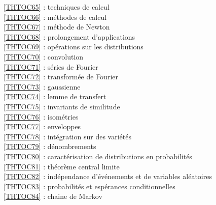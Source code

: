 \ref {THTOC65} : techniques de calcul\\
\ref {THTOC66} : méthodes de calcul\\
\ref {THTOC67} : méthode de Newton\\
\ref {THTOC68} : prolongement d'applications\\
\ref {THTOC69} : opérations sur les distributions\\
\ref {THTOC70} : convolution\\
\ref {THTOC71} : séries de Fourier\\
\ref {THTOC72} : transformée de Fourier\\
\ref {THTOC73} : gaussienne\\
\ref {THTOC74} : lemme de transfert\\
\ref {THTOC75} : invariants de similitude\\
\ref {THTOC76} : isométries\\
\ref {THTOC77} : enveloppes\\
\ref {THTOC78} : intégration sur des variétés\\
\ref {THTOC79} : dénombrements\\
\ref {THTOC80} : caractérisation de distributions en probabilités\\
\ref {THTOC81} : théorème central limite\\
\ref {THTOC82} : indépendance d'événements et de variables aléatoires\\
\ref {THTOC83} : probabilités et espérances conditionnelles\\
\ref {THTOC84} : chaine de Markov\\
